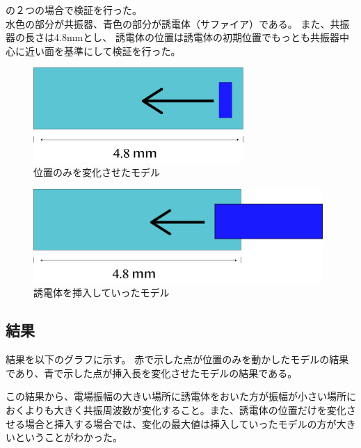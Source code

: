 の２つの場合で検証を行った。\\
水色の部分が共振器、青色の部分が誘電体（サファイア）である。
また、共振器の長さは4.8mmとし、
誘電体の位置は誘電体の初期位置でもっとも共振器中心に近い面を基準にして検証を行った。

\vspace{10 mm}

\begin{figure}[h]
  \begin{center}
    \includegraphics[width=8cm]{./image/pos.png}
    \caption{位置のみを変化させたモデル}
    \label{fig:potition}
  \end{center}
\end{figure}

\vspace{10 mm}

\begin{figure}[h]
  \begin{center}
    \includegraphics[width=11cm]{./image/length.png}
    \caption{誘電体を挿入していったモデル}
    \label{fig:length}
  \end{center}
\end{figure}

\subsection*{結果}
結果を以下のグラフに示す。
赤で示した点が位置のみを動かしたモデルの結果であり、青で示した点が挿入長を変化させたモデルの結果である。

この結果から、電場振幅の大きい場所に誘電体をおいた方が振幅が小さい場所におくよりも大きく共振周波数が変化すること。また、誘電体の位置だけを変化させる場合と挿入する場合では、変化の最大値は挿入していったモデルの方が大きいということがわかった。

